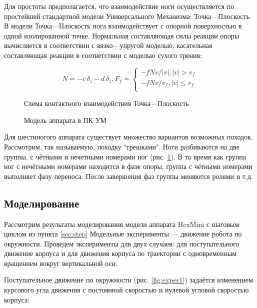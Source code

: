 Для простоты предполагается, что взаимодействие ноги осуществляется по простейшей стандартной модели Универсального Механизма: Точка---Плоскость. В модели Точка---Плоскость нога взаимодействует с опорной поверхностью в одной изолированной точке. Нормальная составляющая силы реакции опоры вычисляется в соответствии с вязко---упругой моделью, касательная составляющая реакции в соответствии с моделью сухого трения:

$$
N = -c\,\delta_z-d\,\dot{\delta}_z, {F_f} = \left\{
\begin{array}{lcr}
-fNv/|v|, |v|>v_f\\
-fNv/v_f,|v|\leq v_f\\
\end{array}
\right.
$$




\begin{figure}
\caption{Схема контактного взаимодействия Точка---Плоскость}
\end{figure}
 
 
\begin{figure}[h]
\center{\texttt{[image: UM2]}}
\caption{Модель аппарата в ПК УМ}
\label{fig:UM}
\end{figure}  

Для шестиногого аппарата существует множество вариантов возможных походок. Рассмотрим, так называемую, походку "трешками". Ноги разбиваются на две группы, с чётными и нечетными номерами ног (рис. \ref{fig:UM}). В то время как группа ног с нечётными номерами находится в фазе опоры, группа с чётными номерами выполняет фазу переноса. После завершения фаз группы меняются ролями и т.д.


\newpage
\subsection{Моделирование}

Рассмотрим результаты моделирования модели аппарата HexMini с шаговым циклом из пункта \ref{sec:step} Модельные эксперименты --- движение робота по окружности. Проведем эксперименты для двух случаев: для поступательного движение корпуса и для движения корпуса по траектории с одновременным вращением вокруг вертикальной оси.


\label{sec:exper1}
Поступательное движение по окружности (рис. \ref{fig:exper1}) задаётся изменением курсового угла движения с постоянной скоростью и нулевой угловой скоростью корпуса:

